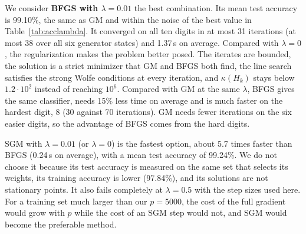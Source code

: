 We consider \textbf{BFGS with $\lambda=0.01$} the best combination. Its mean test accuracy is 99.10\%, the same as GM and within the noise of the best value in Table~\ref{tab:acclambda}. It converged on all ten digits in at most 31 iterations (at most 38 over all six generator states) and 1.37\,s on average. Compared with $\lambda=0$, the regularization makes the problem better posed. The iterates are bounded, the solution is a strict minimizer that GM and BFGS both find, the line search satisfies the strong Wolfe conditions at every iteration, and $\kappa(H_k)$ stays below $1.2\cdot10^{2}$ instead of reaching $10^{6}$. Compared with GM at the same $\lambda$, BFGS gives the same classifier, needs 15\% less time on average and is much faster on the hardest digit, 8 (30 against 70 iterations). GM needs fewer iterations on the six easier digits, so the advantage of BFGS comes from the hard digits.

SGM with $\lambda=0.01$ (or $\lambda=0$) is the fastest option, about 5.7 times faster than BFGS (0.24\,s on average), with a mean test accuracy of 99.24\%. We do not choose it because its test accuracy is measured on the same set that selects its weights, its training accuracy is lower (97.84\%), and its solutions are not stationary points. It also fails completely at $\lambda=0.5$ with the step sizes used here. For a training set much larger than our $p=5000$, the cost of the full gradient would grow with $p$ while the cost of an SGM step would not, and SGM would become the preferable method.
